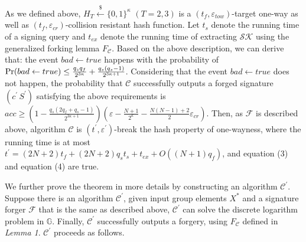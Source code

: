 \documentclass[journal]{IEEEtran}
\begin{document}
As we defined above, \(H_T\stackrel{\$}\leftarrow {\{0,1\}}^{\kappa}\) \((T=2,3)\) is a \((t_f,\varepsilon_{tow})\)-target one-way as well as \((t_f,\varepsilon_{cr})\)-collision resistant hash function. Let \(t_s\) denote the running time of a signing query and \(t_{ex}\) denote the running time of extracting \(\mathcal{SK}\) using the generalized forking lemma \(F_\mathcal{C}\). Based on the above description, we can derive that: the event \(bad\leftarrow true\) happens with the probability of
\(\textup{Pr}(bad\leftarrow true)\leq\frac{q_sq_f}{2^{3\kappa}}+\frac{q_s(q_s-1)}{2^{3\kappa+1}}\).
Considering that the event \(bad\leftarrow true\) does not happen, the probability that \(\mathcal{C}\) successfully outputs a forged signature \((c^\prime\,S^\prime)\) satisfying the above requirements is \(acc\geq(1-\frac{q_s(2q_f+q_s-1)}{2^{3\kappa+1}})(\varepsilon-\frac{N+1}{2^{\kappa}}-\frac{N(N-1)+2}{2}\varepsilon_{cr})\). Then, as \(\mathcal{F}\) is described above, algorithm \(\mathcal{C}\) is \((t^\prime,\varepsilon^\prime)\)-break the hash property of one-wayness, where the running time is at most %
\(t^\prime=(2N+2)t_f+(2N+2)q_st_s+t_{ex}+O((N+1)q_f)\), and equation (3) and equation (4) are true.

We further prove the theorem in more details by constructing an algorithm \(\mathcal{C}^\prime\). Suppose there is an algorithm $\mathcal{C}^\prime$, given input group elements $X^\ast$ and a signature forger $\mathcal{F}$ that is the same as described above, $\mathcal{C}^\prime$ can solve the discrete logarithm problem in $\mathbb{G}$. Finally, \(\mathcal{C}^\prime\) successfully outputs a forgery, using \(F_\mathcal{C}\) defined in \noindent\emph{Lemma 1}. \(\mathcal{C}^\prime\) proceeds as follows.
\end{document}
